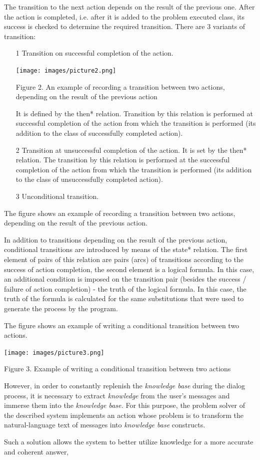 \documentclass[a4paper, 10pt,]{article}
\begin{document}
The transition to the next action depends on the result of the previous one. After the action is completed, i.e.
after it is added to the problem executed class, its success is checked to determine the required transition. There are 3 variants of transition:
\begin{enumerate}
 \item[1] Transition on successful completion of the action.

{
    \centering
    \texttt{[image: images/picture2.png]}
    \caption{\footnotesize Figure 2. An example of recording a transition between two actions,
depending on the result of the previous action}
    \label{fig:picture2}
}

 It is defined by the then* relation. Transition by this relation is performed at successful completion of the action from which the transition is performed (its addition to the class of successfully completed action).

\item[2] Transition at unsuccessful completion of the action.
It is set by the then* relation. The transition by this relation is performed at the successful completion of the action from which the transition is performed (its addition to the class of unsuccessfully completed action).

\item[3] Unconditional transition.
\end{enumerate}
The figure \pageref {fig:picture2} shows an example of recording a transition between two actions, depending on the result of the previous action.

In addition to transitions depending on the result of the previous action, conditional transitions are introduced by means of the state* relation. The first element of pairs of this relation are pairs (arcs) of transitions according to the success of action completion, the second element is a logical formula.
In this case, an additional condition is imposed on the transition pair (besides the success / failure of action completion) - the truth of the logical formula. In this case, the truth of the formula is calculated for the same substitutions that were used to generate the process by the program.

The figure \pageref{fig:picture3} shows an example of writing a conditional transition between two actions. 

{
\centering
  \texttt{[image: images/picture3.png]}
  \caption{\footnotesize Figure 3. Example of writing a conditional transition between two actions}
  \label{fig:picture3}
}

However, in order to constantly replenish the \textit{knowledge base} during the dialog process, it is necessary to extract \textit{knowledge} from the user’s messages and immerse them into the \textit{knowledge base.} For this purpose, the problem solver of the described system implements an action whose problem is to transform the natural-language text of messages into \textit{knowledge base} constructs.

Such a solution allows the system to better utilize knowledge for a more accurate and coherent answer,
\end{document}
